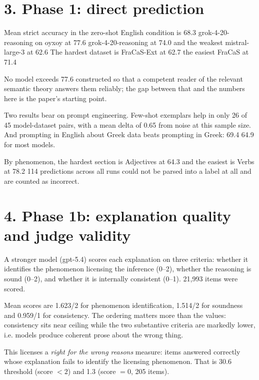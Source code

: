 \documentclass[11pt]{article}
\begin{document}
\section{3. Phase 1: direct prediction}

Mean strict accuracy in the zero-shot English condition is
68.3%
grok-4-20-reasoning on oyxoy at
77.6%
grok-4-20-reasoning at
74.0%
and the weakest mistral-large-3 at
62.6%
The hardest dataset is FraCaS-Ext at
62.7%
the easiest FraCaS at
71.4%

No model exceeds 77.6%
constructed so that a competent reader of the relevant semantic theory
answers them reliably; the gap between that and the numbers here is the
paper's starting point.

Two results bear on prompt engineering. Few-shot exemplars help in only
26 of 45 model-dataset
pairs, with a mean delta of 0.65%
from noise at this sample size. And prompting in English about Greek data
beats prompting in Greek: 69.4%
64.9%
for most models.

By phenomenon, the hardest section is
Adjectives at
64.3%
and the easiest is Verbs at
78.2%
114 predictions across all runs could not be parsed
into a label at all and are counted as incorrect.

\section{4. Phase 1b: explanation quality and judge validity}

A stronger model (gpt-5.4) scores each explanation on three criteria:
whether it identifies the phenomenon licensing the inference (0--2),
whether the reasoning is sound (0--2), and whether it is internally
consistent (0--1). 21,993 items were scored.

Mean scores are 1.623/2 for phenomenon
identification, 1.514/2 for soundness and
0.959/1 for consistency. The ordering matters more
than the values: consistency sits near ceiling while the two substantive
criteria are markedly lower, i.e. models produce coherent prose about the
wrong thing.

This licenses a \emph{right for the wrong reasons} measure: items answered
correctly whose explanation fails to identify the licensing phenomenon.
That is 30.6%
threshold (score $<2$) and 1.3%
(score $=0$, 205 items).
\end{document}
